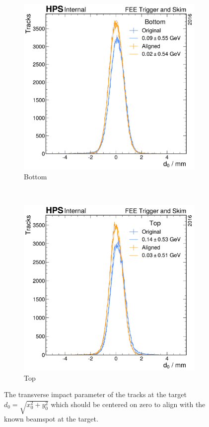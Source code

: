 \begin{figure}
  \centering
  \begin{subfigure}{0.48\textwidth}
    \includegraphics[width=\textwidth]{figures/hps/alignment/d0_bottom.pdf}
    \caption{Bottom}
  \end{subfigure}
  ~
  \begin{subfigure}{0.48\textwidth}
    \includegraphics[width=\textwidth]{figures/hps/alignment/d0_top.pdf}
    \caption{Top}
  \end{subfigure}
  \caption{The transverse impact parameter of the tracks at the target
  $d_0 = \sqrt{x_0^2+y_0^2}$ which should be centered on zero to align with
  the known beamspot at the target.}
  \label{fig:example-align-d0}
\end{figure}

